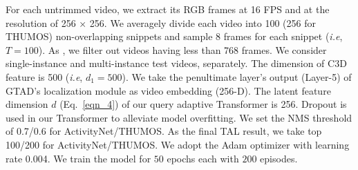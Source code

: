 \documentclass{bmvc2k}
\def\ie{\emph{i.e}\bmvaOneDot}
\begin{document}
\noindent For each untrimmed video, we extract its RGB frames at 16 FPS and at the resolution of 256 × 256. We averagely divide each video into 100 (256 for THUMOS) non-overlapping snippets and sample 8 frames for each snippet (\ie, $T=100$). As \cite{yang2020localizing}, we filter out videos having less than 768 frames.
We consider single-instance and multi-instance test videos, separately.
The dimension of C3D feature is 500 (\ie, $d_1=500$). 
We take the penultimate layer's output (Layer-5) of GTAD's localization module as video embedding (256-D).
The latent feature dimension $d$ (Eq.~\eqref{eqn_4}) of our query adaptive Transformer is 256.
Dropout is used in our Transformer to alleviate model overfitting.
We set the NMS threshold of 0.7/0.6 for ActivityNet/THUMOS.
As the final TAL result, we take top 100/200 for ActivityNet/THUMOS. 
We adopt the Adam optimizer \cite{sutskever2013importance} with learning rate 0.004.
We train the model for $50$ epochs each with $200$ episodes.
\end{document}
